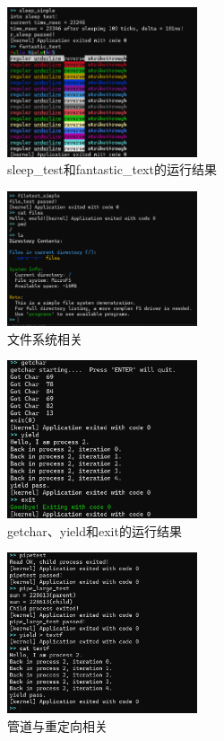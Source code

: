 \begin{figure}[htbp]
    \centering
    \includegraphics[width=0.5\textwidth]{../image/sleep_test_and_color.png}
    \caption{sleep\_test和fantastic\_text的运行结果}
    \label{fig:sleep_test_and_color}
\end{figure}

\begin{figure}[H]
    \centering
    \includegraphics[width=0.5\textwidth]{../image/file.png}
    \caption{文件系统相关}
    \label{fig:file}
\end{figure}

\begin{figure}[htbp]
    \centering
    \includegraphics[width=0.5\textwidth]{../image/getchar_yield_exit.png}
    \caption{getchar、yield和exit的运行结果}
    \label{fig:getchar_yield_exit}
\end{figure}

\begin{figure}[htbp]
    \centering
    \includegraphics[width=0.5\textwidth]{../image/pipe.png}
    \caption{管道与重定向相关}
    \label{fig:pipe}
\end{figure}

